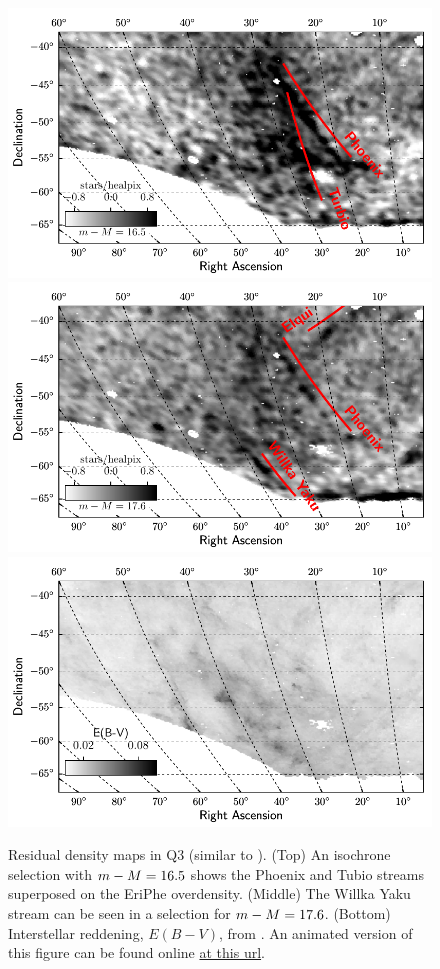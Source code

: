 \documentclass[twocolumn]{aastex61}
\begin{document}
\begin{figure}[]
  \centering
  \includegraphics[width=\columnwidth]{residual_q3_m16p5_v17p2_label}  
  \includegraphics[width=\columnwidth]{residual_q3_m17p6_v17p2_label}
  \includegraphics[width=\columnwidth]{sfd_ebv_q3}
  \caption{Residual density maps in Q3 (similar to ). 
    (Top) An isochrone selection with $m - M = 16.5$ shows the Phoenix and Tubio streams superposed on the EriPhe overdensity.
    (Middle) The Willka Yaku stream can be seen in a selection for $m - M = 17.6$.
    (Bottom) Interstellar reddening,  $E(B-V)$, from \citet{Schlegel:1998}.
    An animated version of this figure can be found online \href{http://home.fnal.gov/~kadrlica/movies/residual_q3_v17p2_label.gif}{at this url}.
}
  \label{fig:q3}
\end{figure}
\end{document}

